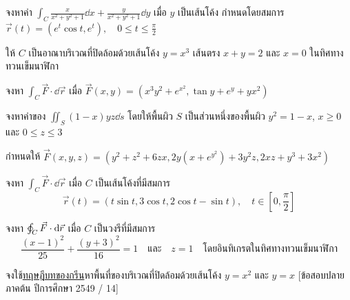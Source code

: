 \documentclass[12pt,final]{novelette} %
\begin{document}
\begin{question}
\begin{question}


        \item
        จงหาค่า $\displaystyle \int_C \frac{x}{x^2+y^2+1} \dd{x} + \frac{y}{x^2+y^2+1} \dd{y}$ เมื่อ $y$ เป็นเส้นโค้ง
        กำหนดโดยสมการ \\[.5em]
        $\displaystyle \vec{r}(t) = (e^t \cos t, e^t), \quad 0 \leq t \leq \frac{\pi}{2}$ 


    \end{question}

    \item {}
    ให้ $C$ เป็นอาณาบริเวณที่ปิดล้อมด้วยเส้นโค้ง $y = x^3$ เส้นตรง $x + y = 2$ และ $x = 0$ ในทิศทางทวนเข็มนาฬิกา

    จงหา $\int_C \vec{F} \cdot \dd{\vec{r}}$ เมื่อ $\vec{F}(x, y) = (x^3y^2 + e^{x^2}, \tan y + e^y + yx^2)$ 



    \item {}
    จงหาค่าของ $\iint_S (1-x)yz \dd{s}$ โดยให้พื้นผิว $S$ เป็นส่วนหนึ่งของพื้นผิว $y^2 = 1-x$, $x \geq 0$ และ $0 \leq z \leq 3$ 



    \item {}
    กำหนดให้ $\vec{F}(x, y, z) = (y^2 + z^2 + 6zx, 2y(x + e^{y^2}) + 3y^2z, 2xz + y^3 + 3x^2)$

    \begin{question}
        \item
        จงหา $\int_C \vec{F} \cdot \dd{\vec{r}}$ เมื่อ $C$ เป็นเส้นโค้งที่มีสมการ
        $$
            \vec{r}(t) = (t \sin t, 3 \cos t, 2 \cos t - \sin t), \quad t \in \left[0, \frac\pi2\right]
        $$



        \item
        จงหา $\varointctrclockwise_C \vec{F} \cdot \dd{\vec{r}}$  เมื่อ $C$ เป็นวงรีที่มีสมการ
        $$
            \frac{(x-1)^2}{25} + \frac{(y+3)^2}{16} = 1 \quad \text{และ} \quad z = 1 \quad \text{โดยอินทิเกรตในทิศทางทวนเข็มนาฬิกา}
        $$


    \end{question}
\end{question}

\pagebreak

\noindent
จงใช้\uline{ทฤษฎีบทของกรีน}หาพื้นที่ของบริเวณที่ปิดล้อมด้วยเส้นโค้ง $y = x^2$ และ $y = x$
[ข้อสอบปลายภาคต้น ปีการศึกษา 2549 / 14]


\end{document}
